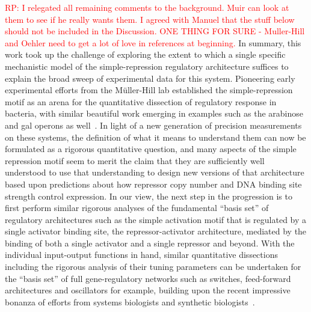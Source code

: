 \textcolor{red}{RP: I relegated all remaining comments to the background.  Muir
can look at them to see if he really wants them.  I agreed with Manuel that the stuff
below should not be included in the Discussion.  ONE THING FOR SURE - Muller-Hill
and Oehler need to get a lot of love in references at beginning.}
In summary, this work took up the challenge of exploring the extent
to which a single specific mechanistic model of the simple-repression regulatory
architecture suffices to explain the broad sweep of experimental
data for this system.  Pioneering early experimental efforts from
the M\"{u}ller-Hill lab established the simple-repression motif
as an arena for the quantitative dissection of regulatory response in
bacteria, with similar beautiful work emerging in examples such as the
arabinose and gal operons as well~\cite{Dunn1984b, Oehler1990, Oehler1994, Schleif2000,Weickert1993, Semsey2002, SwintKruse2009}.  In light of a new generation of precision measurements
on these systems, the definition of what it means to understand them can now
be formulated as a rigorous quantitative question, and many aspects of
the simple repression motif seem to merit the claim that they are sufficiently
well understood to use that understanding to design new versions of that
architecture based upon predictions about how repressor copy number and DNA binding site strength
control expression.  In our view, the next step in the progression is
to first perform similar rigorous analyses of the fundamental ``basis set'' of regulatory
architectures such as the simple activation motif that is regulated by
a single activator binding site, the repressor-activator architecture, mediated by
the binding of both a single activator and a single repressor and beyond.
With the individual input-output functions in hand, similar quantitative
dissections including the rigorous analysis of their tuning parameters can be undertaken
for the ``basis set'' of full gene-regulatory networks such as switches, feed-forward architectures and
oscillators for example, building upon the recent impressive bonanza of efforts from
systems biologists and synthetic biologists~\cite{Milo2002,Alon2007}.


